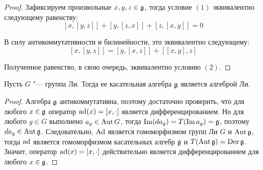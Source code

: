 \begin{proof}
	Зафиксируем произвольные $x, y, z \in \mathfrak g$, тогда условие $(1)$ эквивалентно следующему равенству:
	\[[x, [y, z]] + [y, [z, x]] + [z, [x, y]] = 0\]
	
	В силу антикоммутативности и билинейности, это эквивалентно следующему:
	\[[x, [y, z]] = [y, [x, z]] + [[x, y], z]\]
	
	Полученное равенство, в свою очередь, эквивалентно условию $(2)$.
\end{proof}

\begin{corollary}
	Пусть $G$ "--- группа Ли. Тогда ее касательная алгебра $\mathfrak g$ является алгеброй Ли.
\end{corollary}

\begin{proof}
	Алгебра $\mathfrak g$ антикоммутативна, поэтому достаточно проверить, что для любого $x \in \mathfrak g$ оператор $\operatorname{ad} (x) = [x, \cdot]$ является дифференцированием. Но для любого $g \in G$ выполнено $a_g \in \operatorname{Aut} G$, тогда $\operatorname{Im} (da_g) = T(\operatorname{Im} a_g) = \mathfrak g$, поэтому $da_g \in \operatorname{Aut}\mathfrak g$. Следовательно, $\operatorname{Ad}$ является гомоморфизмом групп Ли $G$ и $\operatorname{Aut}{\mathfrak g}$, тогда $\operatorname{ad}$ является гомоморфизмом касательных алгебр $\mathfrak g$ и $T(\operatorname{Aut}{\mathfrak g}) = \operatorname{Der}{\mathfrak g}$. Значит, оператор $\operatorname{ad} (x) = [x, \cdot]$ действительно является дифференцированием для любого $x \in \mathfrak g$.
\end{proof}